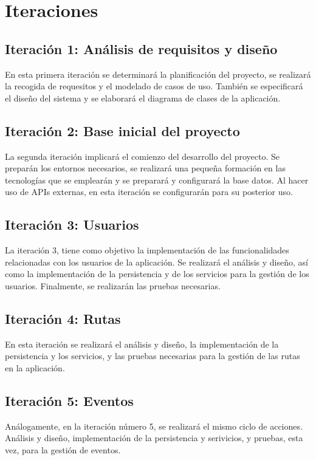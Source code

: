 \section{Iteraciones}
\subsection{Iteración 1: Análisis de requisitos y diseño}

En esta primera iteración se determinará la planificación del proyecto, se realizará la recogida de requesitos y el modelado de casos de uso. También se especificará el diseño del sistema y se elaborará el diagrama de clases de la aplicación.


\subsection{Iteración 2: Base inicial del proyecto}
La segunda iteración implicará el comienzo del desarrollo del proyecto. Se preparán los entornos necesarios, se realizará una pequeña formación en las tecnologías que se emplearán y se preparará y configurará la base datos. Al hacer uso de APIs externas, en esta iteración se configurarán para su posterior uso.


\subsection{Iteración 3: Usuarios}
La iteración 3, tiene como objetivo la implementación de las funcionalidades relacionadas con los usuarios de la aplicación. Se realizará el análisis y diseño, así como la implementación de la persistencia y de los servicios para la gestión de los usuarios. Finalmente, se realizarán las pruebas necesarias.


\subsection{Iteración 4: Rutas}
En esta iteración se realizará el análisis y diseño, la implementación de la persistencia y los servicios, y las pruebas necesarias para la gestión de las rutas en la aplicación.


\subsection{Iteración 5: Eventos}
Análogamente, en la iteración número 5, se realizará el mismo ciclo de acciones. Análisis y diseño, implementación de la persistencia y serivicios, y pruebas, esta vez, para la gestión de eventos.



